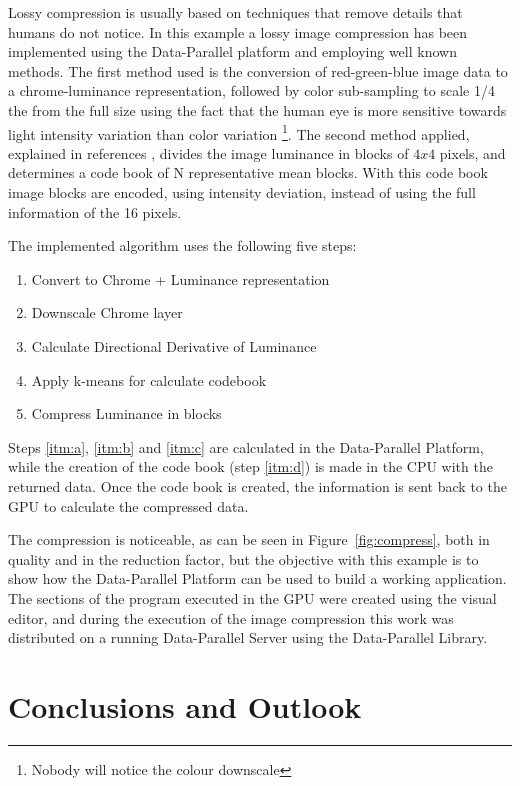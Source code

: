 \documentclass[conference]{IEEEtran}
\begin{document}
Lossy compression is usually based on techniques that remove details that humans
do not notice. In this example a lossy image compression has been implemented
using the Data-Parallel platform and employing well known methods.  The first
method used is the conversion of red-green-blue image data to a chrome-luminance
representation, followed by color sub-sampling to scale 1/4 the from the full
size using the fact that the human eye is more sensitive towards light intensity
variation than color variation \footnote{Nobody will notice the colour
  downscale}. The second method applied, explained in references
\cite{citeulike:5759381} \cite{qiu1995}, divides the image luminance in blocks
of $4x4$ pixels, and determines a code book of N representative mean blocks.
With this code book image blocks are encoded, using intensity deviation, instead
of using the full information of the 16 pixels.

The implemented algorithm uses the following five steps:

\begin{enumerate}
\item \label{itm:a}Convert to Chrome + Luminance representation
\item \label{itm:b}Downscale Chrome layer
\item \label{itm:c}Calculate Directional Derivative of Luminance
\item \label{itm:d}Apply k-means for calculate codebook
\item \label{itm:e}Compress Luminance in blocks
\end{enumerate}

Steps \ref{itm:a}, \ref{itm:b} and \ref{itm:c} are calculated in the
Data-Parallel Platform, while the creation of the code book (step
\ref{itm:d}) is made in the CPU with the returned data.  Once the code book is
created, the information is sent back to the GPU to calculate the compressed
data.

The compression is noticeable, as can be seen in Figure~\ref{fig:compress}, both
in quality and in the reduction factor, but the objective with this example is to show how
the Data-Parallel Platform can be used to build a working application.  The
sections of the program executed in the GPU were created using the visual
editor, and during the execution of the image compression this work was
distributed on a running Data-Parallel Server using the Data-Parallel Library.

\section{Conclusions and Outlook}
\end{document}
